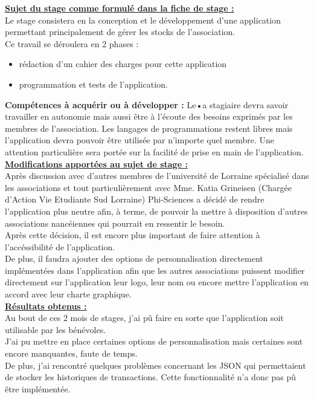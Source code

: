 \documentclass[11pt, twoside]{article}
\begin{document}
{\large\underline{\textbf{Sujet du stage comme formulé dans la fiche de stage :}}}
\vspace*{0.3cm}\\
Le stage consistera en la conception et le développement d’une application permettant principalement de gérer les stocks de
l’association.\\
Ce travail se déroulera en 2 phases :
\begin{itemize}
    \item rédaction d’un cahier des charges pour cette application 
    \item programmation et tests de l’application.
\end{itemize}
{\textbf{Compétences à acquérir ou à développer :}}
Le•a stagiaire devra savoir travailler en autonomie mais aussi être à l’écoute des besoins exprimés par les membres de l’association.
Les langages de programmations restent libres mais l’application devra pouvoir être utilisée par n’importe quel membre. Une attention particulière sera portée sur la facilité de prise en main de l’application.
\vspace*{0.3cm}\\
{\large\underline{\textbf{Modifications apportées au sujet de stage :}}}
\vspace*{0.3cm}\\
Après discussion avec d'autres membres de l'université de Lorraine spécialisé dans les associations et tout particulièrement avec Mme. Katia Grineisen (Chargée d'Action Vie Etudiante Sud Lorraine) Phi-Sciences a décidé de rendre l'application plus neutre afin, à terme, de pouvoir la mettre à disposition d'autres associations nancéiennes qui pourrait en ressentir le besoin.\\
Après cette décision, il est encore plus important de faire attention à l'accéssibilité de l'application.\\
De plus, il faudra ajouter des options de personnalisation directement implémentées dans l'application afin que les autres associations puissent modifier directement sur l'application leur logo, leur nom ou encore mettre l'application en accord avec leur charte graphique.
\vspace*{0.3cm}\\
{\large\underline{\textbf{Résultats obtenus :}}}
\vspace*{0.3cm}\\
Au bout de ces 2 mois de stages, j'ai pû faire en sorte que l'application soit utilisable par les bénévoles.\\
J'ai pu mettre en place certaines options de personnalisation mais certaines sont encore manquantes, faute de temps.\\
De plus, j'ai rencontré quelques problèmes concernant les JSON qui permettaient de stocker les historiques de transactions.
Cette fonctionnalité n'a donc pas pû être implémentée.
\newpage
\end{document}

